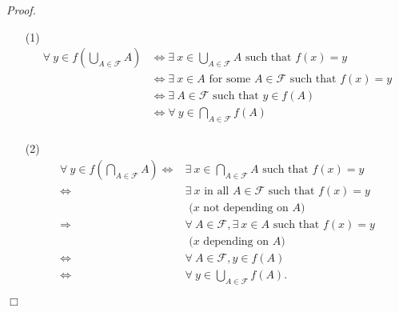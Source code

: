 \documentclass{article}
\begin{document}
\emph{Proof.}
\begin{enumerate}
\item[(1)]
\begin{align*}
  \forall \: y \in f\left( \bigcup_{A \in \mathscr{F}} A \right)
  &\Longleftrightarrow
  \exists \: x \in \bigcup_{A \in \mathscr{F}} A \text{ such that } f(x) = y \\
  &\Longleftrightarrow
  \exists \: x \in A \text{ for some } A \in \mathscr{F} \text{ such that } f(x) = y \\
  &\Longleftrightarrow
  \exists \: A \in \mathscr{F} \text{ such that } y \in f(A) \\
  &\Longleftrightarrow
  \forall \: y \in \bigcap_{A \in \mathscr{F}} f(A) \\
\end{align*}
\item[(2)]
\begin{align*}
  \forall \: y \in f\left( \bigcap_{A \in \mathscr{F}} A \right)
  \Longleftrightarrow&
  \exists \: x \in \bigcap_{A \in \mathscr{F}} A \text{ such that } f(x) = y \\
  \Longleftrightarrow&
  \exists \: x \text{ in all } A \in \mathscr{F} \text{ such that } f(x) = y \\
  &\text{ ($x$ not depending on $A$) } \\
  \Longrightarrow&
  \forall \: A \in \mathscr{F}, \exists \: x \in A \text{ such that } f(x) = y \\
  &\text{ ($x$ depending on $A$) } \\
  \Longleftrightarrow&
  \forall \: A \in \mathscr{F}, y \in f(A) \\
  \Longleftrightarrow&
  \forall \: y \in \bigcup_{A \in \mathscr{F}} f(A).
\end{align*}
\end{enumerate}
$\Box$ \\\\



\end{document}
